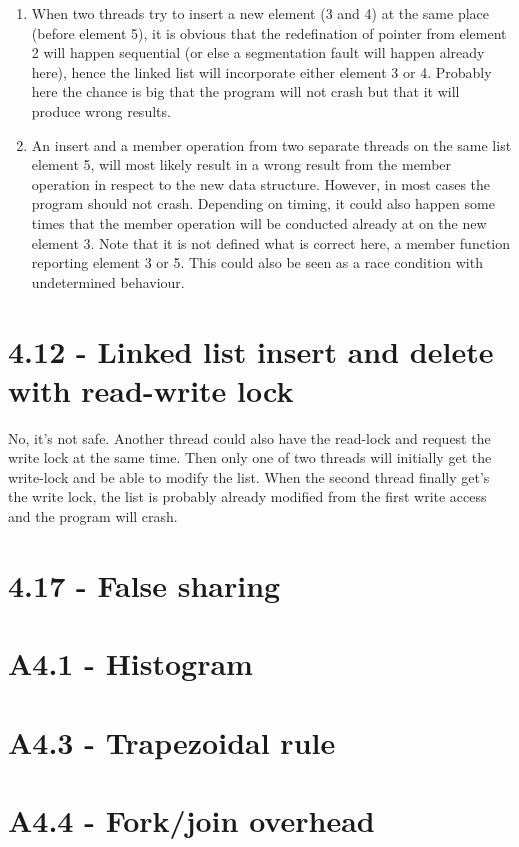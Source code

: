 \documentclass[a4paper,11pt,twoside]{article}
\begin{document}
\begin{enumerate}[label={\alph*)}]
\item When two threads try to insert a new element (3 and 4) at the same place (before element 5), it is obvious that the redefination of pointer from element 2 will happen sequential (or else a segmentation fault will happen already here), hence the linked list will incorporate either element 3 or 4. Probably here the chance is big that the program will not crash but that it will produce wrong results.

  \item An insert and a member operation from two separate threads on the same list element 5, will most likely result in a wrong result from the member operation in respect to the new data structure. However, in most cases the program should not crash. Depending on timing, it could also happen some times that the member operation will be conducted already at on the new element 3. Note that it is not defined what is correct here, a member function reporting element 3 or 5. This could also be seen as a race condition with undetermined behaviour.
\end{enumerate}





\section{4.12 - Linked list insert and delete with read-write lock}
No, it's not safe. Another thread could also have the read-lock and request the write lock at the same time. Then only one of two threads will initially get the write-lock and be able to modify the list. When the second thread finally get's the write lock, the list is probably already modified from the first write access and the program will crash.

\section{4.17 - False sharing}

\section{A4.1 - Histogram}

\section{A4.3 - Trapezoidal rule}

\section{A4.4 - Fork/join overhead}
\end{document}
